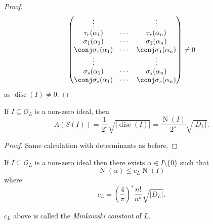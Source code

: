 \documentclass[a4paper]{article}
\renewcommand*{\O}{\mathcal{O}}
\DeclareMathOperator{\n}{N}
\DeclareMathOperator{\disc}{disc}
\begin{document}
\begin{proof}
\[\begin{pmatrix}
      \vdots & & \vdots \\
      \tau_r(\alpha_1) & \cdots & \tau_r(\alpha_n) \\
      \sigma_1(\alpha_1) & \cdots & \sigma_1(\alpha_n) \\
      \conj \sigma_1(\alpha_1) & \cdots & \conj \sigma_1(\alpha_n) \\
      \vdots & & \vdots \\
      \sigma_s(\alpha_1) & \cdots & \sigma_s(\alpha_n) \\
      \conj \sigma_s(\alpha_1) & \cdots & \conj \sigma_s(\alpha_n) \\
    \end{pmatrix}
    \neq 0
  \]
  as \(\disc(I) \neq 0\).
\end{proof}

\begin{lemma}
  If \(I \subseteq \O_L\) is a non-zero ideal, then
  \[
    A(S(I)) = \frac{1}{2^s} \sqrt{|\disc(I)|} = \frac{\n(I)}{2^s} \sqrt{|D_L|}.
  \]
\end{lemma}

\begin{proof}
  Same calculation with determinants as before.
\end{proof}

\begin{proposition}
  If \(I \subseteq \O_L\) is a non-zero ideal then there exists \(\alpha \in I \setminus \{0\}\) such that
  \[
    \n(\alpha) \leq c_L \n(I)
  \]
  where
  \[
    c_L = \left( \frac{4}{\pi} \right)^s \frac{n!}{n^n} \sqrt{|D_L|}.
  \]
\end{proposition}

\begin{definition}
  \(c_L\) above is called the \emph{Minkowski constant} of \(L\).
\end{definition}
\end{document}
